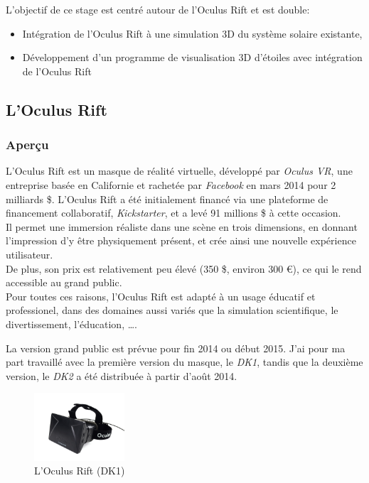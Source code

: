 \documentclass[a4paper,french,12pt]{article}
\begin{document}
		L’objectif de ce stage est centré autour de l'Oculus Rift et est double:
		\begin{itemize}
		 \item Intégration de l'Oculus Rift à une simulation 3D du système solaire existante,
		 \item Développement d'un programme de visualisation 3D  d'étoiles avec intégration de l'Oculus Rift
		\end{itemize}

	
	\subsection{L'Oculus Rift}
		
		\subsubsection{Aperçu}
		  L'Oculus Rift est un masque de réalité virtuelle, développé par \emph{Oculus VR}, une entreprise 
		  basée en Californie et rachetée par \emph{Facebook} en mars 2014 pour  2 milliards \$.
		  L'Oculus Rift a été initialement financé via une plateforme de financement collaboratif, \emph{Kickstarter},
		  et a levé 91 millions \$ à cette occasion. \\
		  Il permet une immersion  réaliste dans une scène en trois dimensions, en donnant l'impression d'y être physiquement
		  présent, et crée ainsi une nouvelle expérience
		  utilisateur. \\
		  De plus, son prix est relativement peu élevé (350 \$, environ 300 \euro), ce qui le rend accessible au grand public. \\
		  Pour toutes ces raisons, l'Oculus Rift est adapté à un usage éducatif et professionel, dans des domaines aussi variés
		  que la simulation scientifique, le divertissement, l'éducation, \ldots.
		  
		  La version grand public est prévue pour fin 2014 ou début 2015. J'ai pour ma part travaillé avec la première
		  version du masque, le \emph{DK1}, tandis que la deuxième version, le \emph{DK2} a été distribuée à partir d'août 2014.
		  
		  \begin{figure}[h!]
		    \centering
		      \includegraphics[width=0.3\textwidth]{dk1.jpg}
		    \caption{L'Oculus Rift (DK1)}
		  \end{figure}
		  
\end{document}
